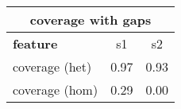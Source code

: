 \documentclass{standalone}
\begin{document}
\begin{tabular}{|l|c|c|}
\hline
\multicolumn{3}{|c|}{\textbf{coverage with gaps}}\\
\hline 

\textbf{feature} & s1 & s2 \\
\hline
coverage (het) & 0.97 & 0.93 \\
coverage (hom) & 0.29 & 0.00 \\
\hline
\end{tabular}
\end{document}
